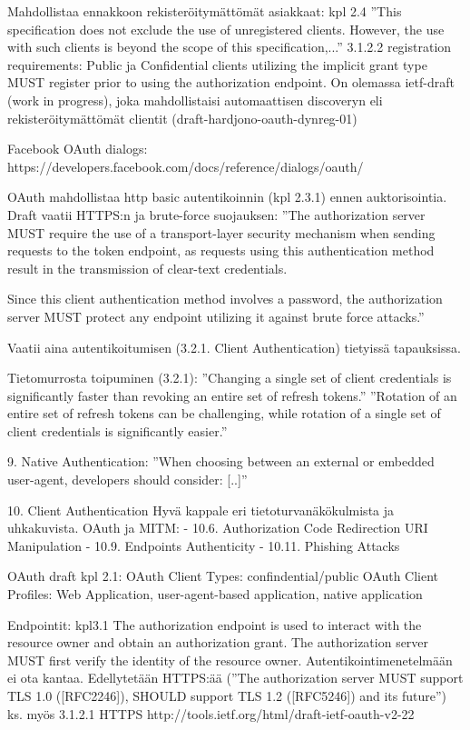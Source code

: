 \documentclass[finnish,gradu]{tktltiki}
\begin{document}
  Mahdollistaa ennakkoon rekisteröitymättömät asiakkaat: kpl 2.4 ''This specification does not exclude the use of unregistered clients. However, the use with
  such clients is beyond the scope of this specification,...''
  3.1.2.2 registration requirements:
    Public ja Confidential clients utilizing the implicit grant type MUST register prior to using the authorization endpoint.
  On olemassa ietf-draft (work in progress), joka mahdollistaisi automaattisen discoveryn eli rekisteröitymättömät clientit (draft-hardjono-oauth-dynreg-01) %

  Facebook OAuth dialogs: https://developers.facebook.com/docs/reference/dialogs/oauth/

  OAuth mahdollistaa http basic autentikoinnin (kpl 2.3.1) ennen auktorisointia.
  Draft vaatii HTTPS:n ja brute-force suojauksen:
    ''The authorization server MUST require the use of a transport-layer
     security mechanism when sending requests to the token endpoint, as
     requests using this authentication method result in the transmission
     of clear-text credentials.

     Since this client authentication method involves a password, the
     authorization server MUST protect any endpoint utilizing it against
     brute force attacks.''

  Vaatii aina autentikoitumisen (3.2.1. Client Authentication) tietyissä tapauksissa.

  Tietomurrosta toipuminen (3.2.1):
  ''Changing a single set of client credentials is significantly faster than revoking an entire set of refresh tokens.''
  ''Rotation of an entire set of refresh tokens can be challenging, while rotation of a single set of client credentials is significantly easier.''

  9. Native Authentication:
  ''When choosing between an external or embedded user-agent, developers should consider: [..]''

  10. Client Authentication
  Hyvä kappale eri tietoturvanäkökulmista ja uhkakuvista.
  OAuth ja MITM:
  - 10.6.  Authorization Code Redirection URI Manipulation
  - 10.9.  Endpoints Authenticity
  - 10.11.  Phishing Attacks


  OAuth draft kpl 2.1:
  OAuth Client Types: confindential/public
  OAuth Client Profiles: Web Application, user-agent-based application, native application

  Endpointit: kpl3.1
   The authorization endpoint is used to interact with the resource
      owner and obtain an authorization grant.  The authorization server
      MUST first verify the identity of the resource owner.
   Autentikointimenetelmään ei ota kantaa.
   Edellytetään HTTPS:ää (''The authorization server MUST support TLS 1.0 ([RFC2246]), SHOULD support TLS 1.2 ([RFC5246]) and its future'')
   ks. myös 3.1.2.1 HTTPS
  http://tools.ietf.org/html/draft-ietf-oauth-v2-22
\end{document}
